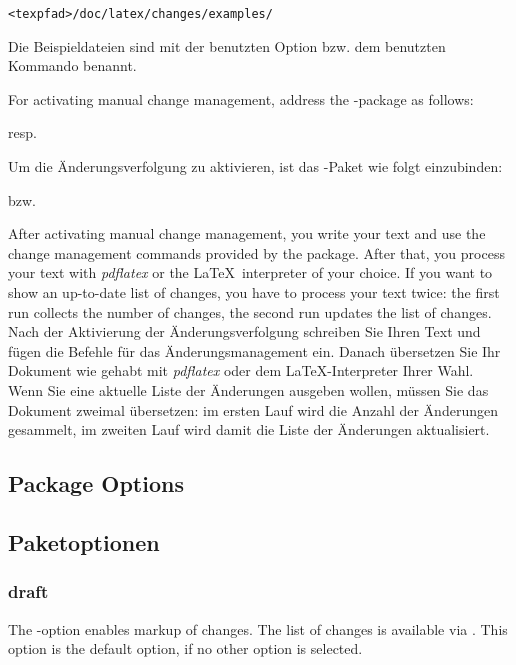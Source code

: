 	\texttt{<texpfad>/doc/latex/changes/examples/}

	Die Beispieldateien sind mit der benutzten Option bzw. dem benutzten Kommando benannt.
\fi

\ifENGLISH
For activating manual change management, address the -package as follows:


resp.

\fi
\ifGERMAN
	Um die Änderungsverfolgung zu aktivieren, ist das -Paket wie folgt einzubinden:


	bzw.

\fi

\ifENGLISH
After activating manual change management, you write your text and use the change management commands provided by the package.
After that, you process your text with \emph{pdflatex} or the \LaTeX\ interpreter of your choice.
If you want to show an up-to-date list of changes, you have to process your text twice: the first run collects the number of changes, the second run updates the list of changes.
\fi
\ifGERMAN
	Nach der Aktivierung der Änderungsverfolgung schreiben Sie Ihren Text und fügen die Befehle für das Änderungsmanagement ein.
	Danach übersetzen Sie Ihr Dokument wie gehabt mit \emph{pdflatex} oder dem \LaTeX-Interpreter Ihrer Wahl.
	Wenn Sie eine aktuelle Liste der Änderungen ausgeben wollen, müssen Sie das Dokument zweimal übersetzen: im ersten Lauf wird die Anzahl der Änderungen gesammelt, im zweiten Lauf wird damit die Liste der Änderungen aktualisiert.
\fi

\ifENGLISH
\subsection{Package Options}
\fi
\ifGERMAN
	\subsection{Paketoptionen}
\fi
\label{sec:user:options}

\subsubsection{draft}
\ifENGLISH
The -option enables markup of changes.
The list of changes is available via .
This option is the default option, if no other option is selected.

